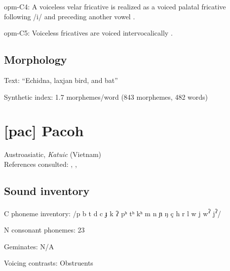 {\begin{appendixdesc}
\item[opm-C4:] A voiceless velar fricative is realized as a voiced palatal fricative following /i/ and preceding another vowel \citep[42]{Loughnane2009}.

\item[opm-C5:] Voiceless fricatives are voiced intervocalically \citep[42]{Loughnane2009}.
\end{appendixdesc}
\subsection*{Morphology}

\begin{appendixdesc}

\item[Text:] “Echidna, laxjan bird, and bat” \citep[493--502]{Loughnane2009}

\item[Synthetic index:] 1.7 morphemes/word (843 morphemes, 482 words)
\end{appendixdesc}
\section*{[pac] Pacoh}   %
Austroasiatic, \textit{Katuic} (Vietnam)\medskip\\
References consulted: \citet{Alves2000}, \citet{Alves2006}, \citet{Watson1980}

\subsection*{Sound inventory}
\begin{appendixdesc}

\item[C phoneme inventory:] /p b t d c ɟ k ʔ pʰ tʰ kʰ m n ɲ ŋ ç h r l w j w\textsuperscript{ʔ} j\textsuperscript{ʔ}/

\item[N consonant phonemes:] 23

\item[Geminates:] N/A

\item[Voicing contrasts:] Obstruents


\end{appendixdesc}}
